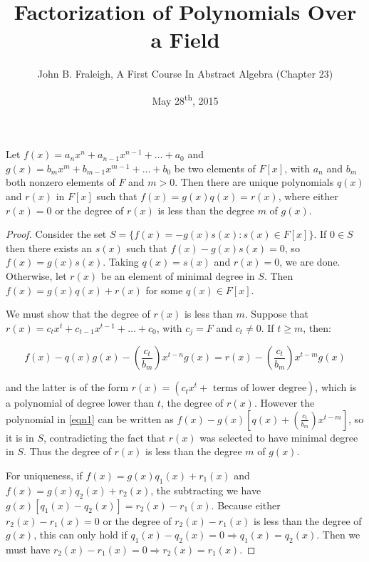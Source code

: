 \documentclass[a4paper,11pt]{article}
\title{Factorization of Polynomials Over a Field}
\author{John B. Fraleigh, A First Course In Abstract Algebra (Chapter 23)}
\date{May 28\textsuperscript{th}, 2015}
\begin{document}
\maketitle
{}

\begin{outline}

    Let \(f(x) = a_nx^n + a_{n-1}x^{n-1} + \ldots + a_0\)
    and \(g(x) = b_mx^m + b_{m-1}x^{m-1} + \ldots + b_0\) be two elements of \(F[x]\), with \(a_n\) and \(b_m\)
    both nonzero elements of \(F\) and \(m > 0\). Then there are unique polynomials \(q(x)\) and \(r(x)\) in \(F[x]\)
    such that \(f(x) = g(x)q(x) = r(x)\), where either \(r(x) = 0\) or the degree of \(r(x)\) is less than the degree
    \(m\) of \(g(x)\).
    
    \begin{proof}
      Consider the set \(S = \{f(x) =- g(x)s(x) : s(x) \in F[x]\}\). If \(0 \in S\) then there exists an \(s(x)\)
      such that \(f(x) - g(x)s(x) = 0\), so \(f(x) = g(x)s(x)\). Taking \(q(x) = s(x)\) and \(r(x) = 0\), we are done.
      Otherwise, let \(r(x)\) be an element of minimal degree in \(S\). Then \(f(x) = g(x)q(x) + r(x)\) for some \(q(x)
      \in F[x]\). 
      
      We must show that the degree of \(r(x)\) is less than \(m\). Suppose that \(r(x) = c_tx^t + c_{t-1}x^{t-1}
      + \ldots + c_0\), with \(c_j = F\) and \(c_t \neq 0\). If \(t \geq m\), then:
      
      \begin{equation}
      \label{eqn1}
      f(x) - q(x)g(x) - (\frac{c_t}{b_m})x^{t-n}g(x) = r(x) - (\frac{c_t}{b_m})x^{t-m}g(x)
      \end{equation}
      
      and the latter is of the form \(r(x) = (c_tx^t + \text{ terms of lower degree})\), which is a polynomial of degree
      lower than \(t\), the degree of \(r(x)\). However the polynomial in \eqref{eqn1} can be written as 
      \(f(x) - g(x)[q(x) + (\frac{c_t}{b_m})x^{t-m}]\), so it is in \(S\), contradicting the fact that 
      \(r(x)\) was selected to have minimal degree in \(S\). Thus the degree of \(r(x)\) is less than the degree \(m\) of
      \(g(x)\).
      
      For uniqueness, if \(f(x) = g(x)q_1(x) + r_1(x)\) and \(f(x) = g(x)q_2(x) + r_2(x)\), the subtracting we have
      \(g(x)[q_1(x)-q_2(x)] = r_2(x) - r_1(x)\). Because either \(r_2(x) - r_1(x) = 0\) or the degree of \(r_2(x) - r_1(x)\)
      is less than the degree of \(g(x)\), this can only hold if \(q_1(x) - q_2(x) = 0 \Rightarrow q_1(x) = q_2(x)\). Then
      we must have \(r_2(x) - r_1(x) = 0 \Rightarrow r_2(x) = r_1(x)\).
    \end{proof}


\end{outline}
\end{document}
